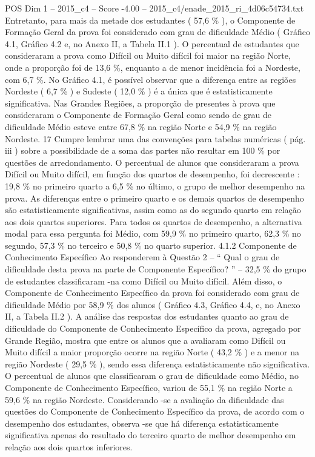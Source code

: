 \begin{textsample}{POS Dim 1 – 2015\_c4 – Score -4.00 – 2015\_c4/enade\_2015\_ri\_4d06c54734.txt}
Entretanto, para mais da metade dos estudantes ( 57,6 \% ), o Componente de Formação Geral da prova foi considerado com grau de dificuldade Médio ( Gráfico 4.1, Gráfico 4.2 e, no Anexo II, a Tabela II.1 ).
O percentual de estudantes que consideraram a prova como Difícil ou Muito difícil foi maior na região Norte, onde a proporção foi de 13,6 \%, enquanto a de menor incidência foi a Nordeste, com 6,7 \%.
No Gráfico 4.1, é possível observar que a diferença entre as regiões Nordeste ( 6,7 \% ) e Sudeste ( 12,0 \% ) é a única que é estatisticamente significativa.
Nas Grandes Regiões, a proporção de presentes à prova que consideraram o Componente de Formação Geral como sendo de grau de dificuldade Médio esteve entre 67,8 \% na região Norte e 54,9 \% na região Nordeste. 17 Cumpre lembrar uma das convenções para tabelas numéricas ( pág. iii ) sobre a possibilidade de a soma das partes não resultar em 100 \% por questões de arredondamento.
O percentual de alunos que consideraram a prova Difícil ou Muito difícil, em função dos quartos de desempenho, foi decrescente : 19,8 \% no primeiro quarto a 6,5 \% no último, o grupo de melhor desempenho na prova.
As diferenças entre o primeiro quarto e os demais quartos de desempenho são estatisticamente significativas, assim como as do segundo quarto em relação aos dois quartos superiores.
Para todos os quartos de desempenho, a alternativa modal para essa pergunta foi Médio, com 59,9 \% no primeiro quarto, 62,3 \% no segundo, 57,3 \% no terceiro e 50,8 \% no quarto superior. 4.1.2 Componente de Conhecimento Específico Ao responderem à Questão 2 – “ Qual o grau de dificuldade desta prova na parte de Componente Específico? ” – 32,5 \% do grupo de estudantes classificaram -na como Difícil ou Muito difícil.
Além disso, o Componente de Conhecimento Específico da prova foi considerado com grau de dificuldade Médio por 58,9 \% dos alunos ( Gráfico 4.3, Gráfico 4.4, e, no Anexo II, a Tabela II.2 ).
A análise das respostas dos estudantes quanto ao grau de dificuldade do Componente de Conhecimento Específico da prova, agregado por Grande Região, mostra que entre os alunos que a avaliaram como Difícil ou Muito difícil a maior proporção ocorre na região Norte ( 43,2 \% ) e a menor na região Nordeste ( 29,5 \% ), sendo essa diferença estatisticamente não significativa.
O percentual de alunos que classificaram o grau de dificuldade como Médio, no Componente de Conhecimento Específico, variou de 55,1 \% na região Norte a 59,6 \% na região Nordeste.
Considerando -se a avaliação da dificuldade das questões do Componente de Conhecimento Específico da prova, de acordo com o desempenho dos estudantes, observa -se que há diferença estatisticamente significativa apenas do resultado do terceiro quarto de melhor desempenho em relação aos dois quartos inferiores.

\end{textsample}
